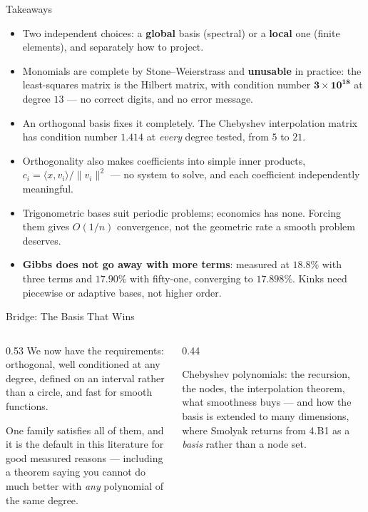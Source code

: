 \begin{frame}{Takeaways}
\begin{takeawaybox}
\begin{itemize}\small
  \item Two independent choices: a \textbf{global} basis (spectral) or a \textbf{local} one (finite elements), and separately how to project.
  \item Monomials are complete by Stone--Weierstrass and \textbf{unusable} in practice: the least-squares matrix is the Hilbert matrix, with condition number $\mathbf{3\times10^{18}}$ at degree $13$ --- no correct digits, and no error message.
  \item An orthogonal basis fixes it completely. The Chebyshev interpolation matrix has condition number $\mathbf{1.414}$ at \emph{every} degree tested, from $5$ to $21$.
  \item Orthogonality also makes coefficients into simple inner products, $c_i=\langle x,v_i\rangle/\|v_i\|^{2}$ --- no system to solve, and each coefficient independently meaningful.
  \item Trigonometric bases suit periodic problems; economics has none. Forcing them gives $O(1/n)$ convergence, not the geometric rate a smooth problem deserves.
  \item \textbf{Gibbs does not go away with more terms}: measured at $18.8\%$ with three terms and $17.90\%$ with fifty-one, converging to $17.898\%$. Kinks need piecewise or adaptive bases, not higher order.
\end{itemize}
\end{takeawaybox}
\end{frame}

\begin{frame}{Bridge: The Basis That Wins}
\begin{columns}[T]
\begin{column}{0.53\textwidth}
\small
We now have the requirements: orthogonal, well conditioned at any degree, defined on an interval rather than a circle, and fast for smooth functions.
\medskip

One family satisfies all of them, and it is the default in this literature for good measured reasons --- including a theorem saying you cannot do much better with \emph{any} polynomial of the same degree.
\end{column}
\begin{column}{0.44\textwidth}
\begin{conceptbox}[title=\textbf{Next (5.B3)}]\small
Chebyshev polynomials: the recursion, the nodes, the interpolation theorem, what smoothness buys --- and how the basis is extended to many dimensions, where Smolyak returns from 4.B1 as a \emph{basis} rather than a node set.
\end{conceptbox}
\end{column}
\end{columns}
\end{frame}


